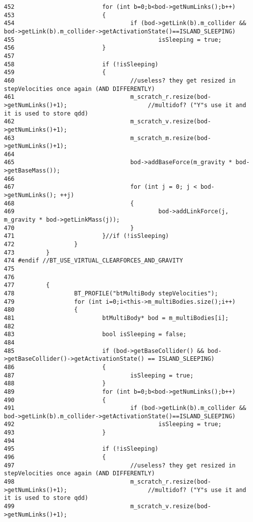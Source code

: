 \begin{Code}
\begin{verbatim}
452                         for (int b=0;b<bod->getNumLinks();b++)
453                         {
454                                 if (bod->getLink(b).m_collider && bod->getLink(b).m_collider->getActivationState()==ISLAND_SLEEPING)
455                                         isSleeping = true;
456                         } 
457 
458                         if (!isSleeping)
459                         {
460                                 //useless? they get resized in stepVelocities once again (AND DIFFERENTLY)
461                                 m_scratch_r.resize(bod->getNumLinks()+1);                       //multidof? ("Y"s use it and it is used to store qdd)
462                                 m_scratch_v.resize(bod->getNumLinks()+1);
463                                 m_scratch_m.resize(bod->getNumLinks()+1);
464 
465                                 bod->addBaseForce(m_gravity * bod->getBaseMass());
466 
467                                 for (int j = 0; j < bod->getNumLinks(); ++j) 
468                                 {
469                                         bod->addLinkForce(j, m_gravity * bod->getLinkMass(j));
470                                 }
471                         }//if (!isSleeping)
472                 }
473         }
474 #endif //BT_USE_VIRTUAL_CLEARFORCES_AND_GRAVITY
475         
476 
477         {
478                 BT_PROFILE("btMultiBody stepVelocities");
479                 for (int i=0;i<this->m_multiBodies.size();i++)
480                 {
481                         btMultiBody* bod = m_multiBodies[i];
482 
483                         bool isSleeping = false;
484                         
485                         if (bod->getBaseCollider() && bod->getBaseCollider()->getActivationState() == ISLAND_SLEEPING)
486                         {
487                                 isSleeping = true;
488                         } 
489                         for (int b=0;b<bod->getNumLinks();b++)
490                         {
491                                 if (bod->getLink(b).m_collider && bod->getLink(b).m_collider->getActivationState()==ISLAND_SLEEPING)
492                                         isSleeping = true;
493                         } 
494 
495                         if (!isSleeping)
496                         {
497                                 //useless? they get resized in stepVelocities once again (AND DIFFERENTLY)
498                                 m_scratch_r.resize(bod->getNumLinks()+1);                       //multidof? ("Y"s use it and it is used to store qdd)
499                                 m_scratch_v.resize(bod->getNumLinks()+1);

\end{verbatim}
\end{Code}
